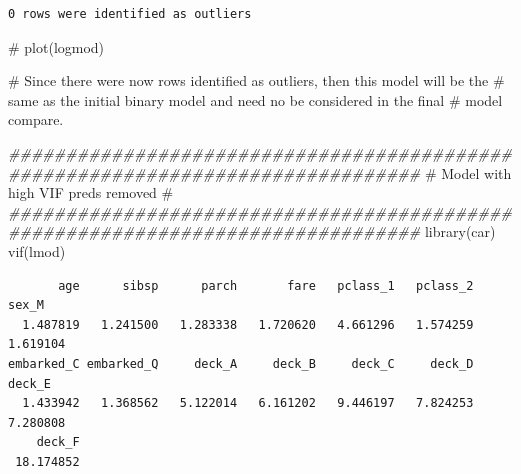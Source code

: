 \documentclass[
  letterpaper,
  DIV=11,
  numbers=noendperiod]{scrartcl}
\newenvironment{Shaded}{\begin{snugshade}}{\end{snugshade}}
\newcommand{\AttributeTok}[1]{\textcolor[rgb]{0.40,0.45,0.13}{#1}}
\newcommand{\CommentTok}[1]{\textcolor[rgb]{0.37,0.37,0.37}{#1}}
\newcommand{\DocumentationTok}[1]{\textcolor[rgb]{0.37,0.37,0.37}{\textit{#1}}}
\newcommand{\FunctionTok}[1]{\textcolor[rgb]{0.28,0.35,0.67}{#1}}
\newcommand{\NormalTok}[1]{\textcolor[rgb]{0.00,0.23,0.31}{#1}}
\newcommand{\OtherTok}[1]{\textcolor[rgb]{0.00,0.23,0.31}{#1}}
\newcommand{\SpecialCharTok}[1]{\textcolor[rgb]{0.37,0.37,0.37}{#1}}
\newcommand{\StringTok}[1]{\textcolor[rgb]{0.13,0.47,0.30}{#1}}
\begin{document}
\begin{Shaded}
\end{Shaded}

\begin{verbatim}
0 rows were identified as outliers
\end{verbatim}

\begin{Shaded}
\begin{Highlighting}[]
\CommentTok{\# plot(logmod)}

\CommentTok{\# Since there were now rows identified as outliers, then this model will be the }
\CommentTok{\# same as the initial binary model and need no be considered in the final }
\CommentTok{\# model compare.}

\DocumentationTok{\#\#\#\#\#\#\#\#\#\#\#\#\#\#\#\#\#\#\#\#\#\#\#\#\#\#\#\#\#\#\#\#\#\#\#\#\#\#\#\#\#\#\#\#\#\#\#\#\#\#\#\#\#\#\#\#\#\#\#\#\#\#\#\#\#\#\#\#\#\#\#\#\#\#\#\#\#\#\#\#}
\CommentTok{\#                Model with high VIF preds removed                             \# }
\DocumentationTok{\#\#\#\#\#\#\#\#\#\#\#\#\#\#\#\#\#\#\#\#\#\#\#\#\#\#\#\#\#\#\#\#\#\#\#\#\#\#\#\#\#\#\#\#\#\#\#\#\#\#\#\#\#\#\#\#\#\#\#\#\#\#\#\#\#\#\#\#\#\#\#\#\#\#\#\#\#\#\#\#}
\FunctionTok{library}\NormalTok{(car)}
\FunctionTok{vif}\NormalTok{(lmod)}
\end{Highlighting}
\end{Shaded}

\begin{verbatim}
       age      sibsp      parch       fare   pclass_1   pclass_2      sex_M 
  1.487819   1.241500   1.283338   1.720620   4.661296   1.574259   1.619104 
embarked_C embarked_Q     deck_A     deck_B     deck_C     deck_D     deck_E 
  1.433942   1.368562   5.122014   6.161202   9.446197   7.824253   7.280808 
    deck_F 
 18.174852 
\end{verbatim}
\end{document}
